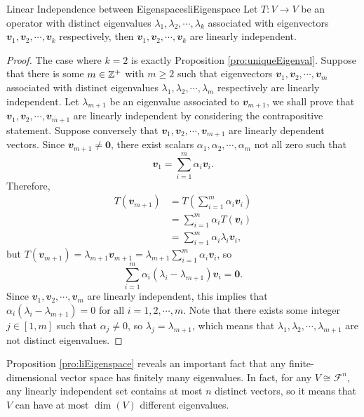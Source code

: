 \documentclass[math, code]{amznotes}
\theoremstyle{remark}
\newcommand{\zero}{\mathbf{0}}
\begin{document}
\begin{probox}{Linear Independence between Eigenspaces}{liEigenspace}
    Let $T \colon V \to V$ be an operator with distinct eigenvalues $\lambda_1, \lambda_2, \cdots, \lambda_k$ associated with eigenvectors $\mathbfit{v}_1, \mathbfit{v}_2, \cdots, \mathbfit{v}_k$ respectively, then $\mathbfit{v}_1, \mathbfit{v}_2, \cdots, \mathbfit{v}_k$ are linearly independent.
    \tcblower
    \begin{proof}
        The case where $k = 2$ is exactly Proposition \ref{pro:uniqueEigenval}. Suppose that there is some $m \in \mathbb{Z}^+$ with $m \geq 2$ such that eigenvectors $\mathbfit{v}_1, \mathbfit{v}_2, \cdots, \mathbfit{v}_m$ associated with distinct eigenvalues $\lambda_1, \lambda_2, \cdots, \lambda_m$ respectively are linearly independent. Let $\lambda_{m + 1}$ be an eigenvalue associated to $\mathbfit{v}_{m + 1}$, we shall prove that $\mathbfit{v}_1, \mathbfit{v}_2, \cdots, \mathbfit{v}_{m + 1}$ are linearly independent by considering the contrapositive statement. Suppose conversely that $\mathbfit{v}_1, \mathbfit{v}_2, \cdots, \mathbfit{v}_{m + 1}$ are linearly dependent vectors. Since $\mathbfit{v}_{m + 1} \neq \zero$, there exist scalars $\alpha_1, \alpha_2, \cdots, \alpha_m$ not all zero such that 
        \begin{equation*}
            \mathbfit{v}_1 = \sum_{i = 1}^{m}\alpha_i\mathbfit{v}_i.
        \end{equation*}
        Therefore, 
        \begin{align*}
            T(\mathbfit{v}_{m + 1}) & = T\left(\sum_{i = 1}^{m}\alpha_i\mathbfit{v}_i\right) \\
            & = \sum_{i = 1}^{m}\alpha_iT(\mathbfit{v}_i) \\
            & = \sum_{i = 1}^{m}\alpha_i\lambda_i\mathbfit{v}_i,
        \end{align*}
        but $T(\mathbfit{v}_{m + 1}) = \lambda_{m + 1}\mathbfit{v}_{m + 1} = \lambda_{m + 1}\sum_{i = 1}^{m}\alpha_i\mathbfit{v}_i$, so
        \begin{equation*}
            \sum_{i = 1}^m\alpha_i(\lambda_i - \lambda_{m + 1})\mathbfit{v}_i = \zero.
        \end{equation*}
        Since $\mathbfit{v}_1, \mathbfit{v}_2, \cdots, \mathbfit{v}_{m}$ are linearly independent, this implies that $\alpha_i(\lambda_i - \lambda_{m + 1}) = 0$ for all $i = 1, 2, \cdots, m$. Note that there exists some integer $j \in [1, m]$ such that $\alpha_j \neq 0$, so $\lambda_j = \lambda_{m + 1}$, which means that $\lambda_1, \lambda_2, \cdots, \lambda_{m + 1}$ are not distinct eigenvalues.
    \end{proof}
\end{probox}
Proposition \ref{pro:liEigenspace} reveals an important fact that any finite-dimensional vector space has finitely many eigenvalues. In fact, for any $V \cong \mathcal{F}^n$, any linearly independent set contains at most $n$ distinct vectors, so it means that $V$ can have at most $\dim(V)$ different eigenvalues.
\end{document}
